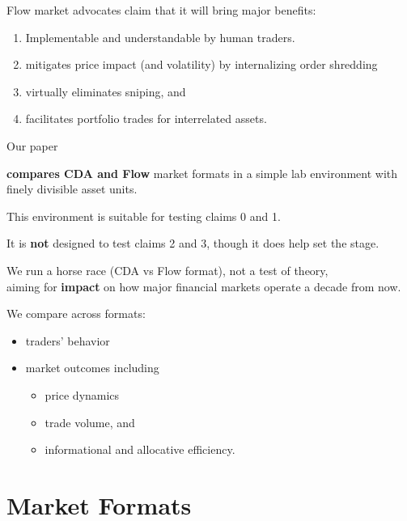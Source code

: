 \documentclass[10pt]{beamer}
\begin{document}
\begin{frame}{Flow market advocates claim}
that it will bring major benefits:
\begin{enumerate}
\item[0.] Implementable and understandable by human traders.
\item mitigates price impact 
(and volatility) by internalizing order shredding \pause
\item virtually eliminates sniping, and \pause
\item facilitates portfolio trades for interrelated assets.
\end{enumerate}
\end{frame}



\begin{frame}{Our paper}

\textbf{compares CDA and Flow} market formats in a simple lab environment  with finely divisible asset units. 
\pause

This environment is 
suitable for testing claims 0 and 1.
\pause

It is \textbf{not} designed to test claims 2 and 3, though it does help set the stage. \pause 

\bigskip

We run a horse race (CDA vs Flow format), not a test of theory,\\ \pause 
aiming for \textbf{impact} on how major financial markets operate a decade from now.
\pause 
\medskip

We compare across formats:
\begin{itemize}
\item traders' behavior \pause
\item market outcomes including 
\begin{itemize}
    \item price dynamics \pause
\item trade volume, and \pause
\item informational and allocative efficiency. 
\end{itemize} 
\end{itemize}


\end{frame}




\section{Market Formats}
\end{document}
